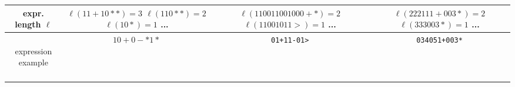 \documentclass[11pt]{article}
\begin{document}
\begin{table}[htbp]
{\begin{tabular}{|c|c|c|c|}
\makecell{expr. length\\$\ell$} & 
\makecell{\\$\ell(11+10**)=3$\\\\$\ell(110**)=2$\\\\$\ell(10*)=1$\\\\...\\\\} & 
\makecell{\\$\ell(110011001000+*)=2$\\\\$\ell(11001011>)=1$\\\\...\\\\} & 
\makecell{\\$\ell(222111+003*)=2$\\\\$\ell(333003*)=1$\\\\...\\\\} \\
\hline

\makecell{\\expression\\example\\\\} & $10+0-*1*$ & \texttt{01+11-01>} & \texttt{034051+003*} \\
\hline

\end{tabular}
}
\end{table}
\end{document}
